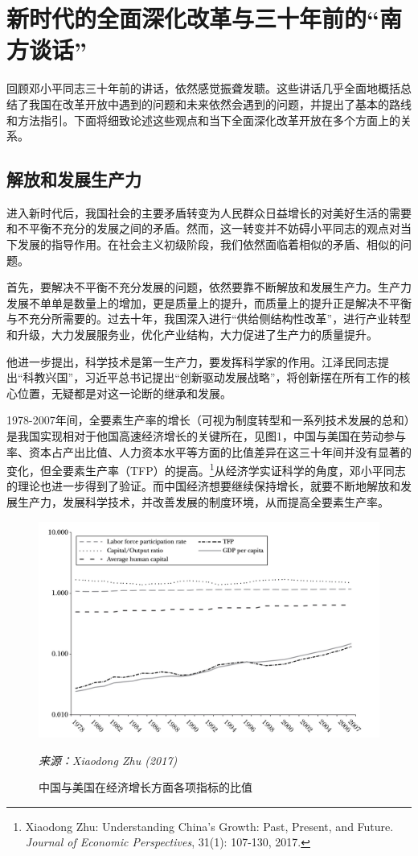 \documentclass[12pt]{article}
\begin{document}
\section{新时代的全面深化改革与三十年前的“南方谈话”}
回顾邓小平同志三十年前的讲话，依然感觉振聋发聩。这些讲话几乎全面地概括总结了我国在改革开放中遇到的问题和未来依然会遇到的问题，并提出了基本的路线和方法指引。下面将细致论述这些观点和当下全面深化改革开放在多个方面上的关系。

\subsection{解放和发展生产力}
进入新时代后，我国社会的主要矛盾转变为人民群众日益增长的对美好生活的需要和不平衡不充分的发展之间的矛盾。然而，这一转变并不妨碍小平同志的观点对当下发展的指导作用。在社会主义初级阶段，我们依然面临着相似的矛盾、相似的问题。

首先，要解决不平衡不充分发展的问题，依然要靠不断解放和发展生产力。生产力发展不单单是数量上的增加，更是质量上的提升，而质量上的提升正是解决不平衡与不充分所需要的。过去十年，我国深入进行“供给侧结构性改革”，进行产业转型和升级，大力发展服务业，优化产业结构，大力促进了生产力的质量提升。

他进一步提出，科学技术是第一生产力，要发挥科学家的作用。江泽民同志提出“科教兴国”，习近平总书记提出“创新驱动发展战略”，将创新摆在所有工作的核心位置，无疑都是对这一论断的继承和发展。

1978-2007年间，全要素生产率的增长（可视为制度转型和一系列技术发展的总和）是我国实现相对于他国高速经济增长的关键所在，见图1，中国与美国在劳动参与率、资本占产出比值、人力资本水平等方面的比值差异在这三十年间并没有显著的变化，但全要素生产率（TFP）的提高。\footnote{Xiaodong Zhu: Understanding China's Growth: Past, Present, and Future. \textit{Journal of Economic Perspectives}, 31(1): 107-130, 2017.}从经济学实证科学的角度，邓小平同志的理论也进一步得到了验证。而中国经济想要继续保持增长，就要不断地解放和发展生产力，发展科学技术，并改善发展的制度环境，从而提高全要素生产率。

\begin{figure}[h]
\centering
\includegraphics[width=\textwidth]{f1.jpg}
\caption{中国与美国在经济增长方面各项指标的比值}
\begin{flushleft}
  \textit{来源：Xiaodong Zhu (2017)}
\end{flushleft}
\end{figure}
\end{document}
